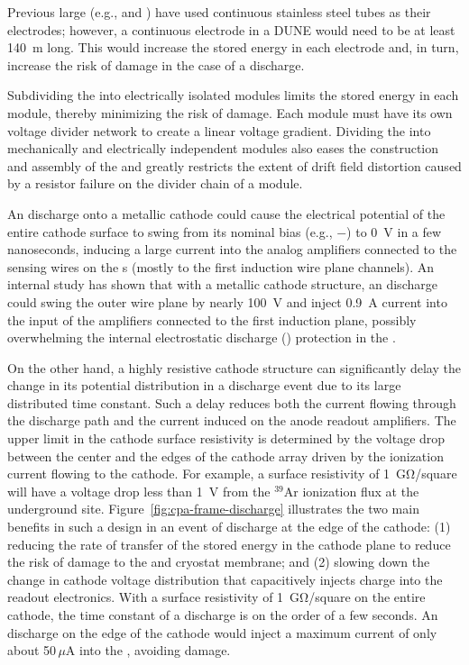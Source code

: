 Previous large  (e.g.,  and ) have used continuous stainless steel tubes as their  electrodes;
however, a continuous electrode in a DUNE  would need to be at least \SI{140}{\m} long. This would increase the stored energy in each electrode and, in turn, increase the risk of damage in the case of a discharge. 

Subdividing the  into electrically isolated modules limits the stored energy in each  module, thereby minimizing the risk of damage. Each  module must have its own voltage divider network to create a linear voltage gradient. Dividing the  into mechanically and electrically independent modules also eases the construction and assembly of the  and greatly restricts the extent of drift field distortion caused by a resistor failure on the divider chain of a  module.

An  discharge onto a metallic cathode could cause the electrical potential of the entire cathode surface to swing from its nominal bias (e.g., $-$\sptargetdriftvoltpos) to \SI{0}{V} in a few nanoseconds, inducing a large current into the analog  amplifiers connected to the sensing wires on the s (mostly to the first induction wire plane channels). 
An internal study\cite{bib:docdb1320} has shown that with a metallic cathode structure, an  discharge could swing the outer wire plane by nearly \SI{100}{V} and inject \SI{0.9}{A} current into the input of the  amplifiers connected to the first induction plane, possibly overwhelming the internal electrostatic discharge () protection in the  .  

On the other hand, a highly resistive cathode structure can significantly delay the change in its potential distribution in a discharge event due to its large distributed  time constant. Such a delay reduces both the current flowing through the discharge path and the current induced on the anode readout amplifiers.  The upper limit in the cathode surface resistivity is 
determined by the voltage drop between the center and the edges of the cathode array driven by the ionization current flowing to the cathode.  For example, a surface resistivity of \SI{1}{\giga\ohm}/square  will have a voltage drop less than \SI{1}{V} from the $^{39}$Ar ionization flux at the underground site. Figure~\ref{fig:cpa-frame-discharge} illustrates the two main 
benefits in such a design in an event of  discharge at the edge of the cathode: (1) reducing the rate of transfer of the stored energy in the cathode plane to reduce the risk of damage to the  and cryostat membrane; and (2) slowing down the change in cathode voltage distribution that capacitively injects charge into the readout electronics.
With a surface resistivity of \SI{1}{\giga\ohm}/square on the entire cathode, the time constant of a discharge is on the order of a few seconds. An  discharge on the edge of the cathode would inject a maximum current of only about 50\,$\mu$A into the  , avoiding damage.



